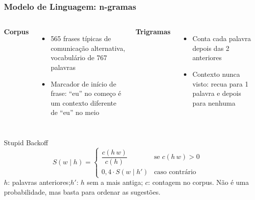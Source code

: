 \documentclass{UnBeamer}
\begin{document}
\subsubsection{Modelo de Linguagem: n-gramas}
\begin{frame}
    \small
    \begin{columns}[T]
            \textbf{Corpus}
            \begin{itemize}
                \item 565 frases típicas de comunicação alternativa,
                      vocabulário de 767 palavras
                \item Marcador de início de frase: ``eu'' no começo é
                      um contexto diferente de ``eu'' no meio
            \end{itemize}
            \textbf{Trigramas}
            \begin{itemize}
                \item Conta cada palavra depois das 2 anteriores
                \item Contexto nunca visto: recua para 1 palavra e
                      depois para nenhuma
            \end{itemize}
    \end{columns}
    \begin{block}{Stupid Backoff~\cite{brants}}
        \[
            S(w \mid h) =
            \begin{cases}
                \dfrac{c(h\,w)}{c(h)} & \text{se } c(h\,w) > 0 \\[1.5ex]
                0{,}4 \cdot S(w \mid h') & \text{caso contrário}
            \end{cases}
        \]
        $h$: palavras anteriores;\quad $h'$: $h$ sem a mais antiga;\quad
        $c$: contagem no corpus.
        Não é uma probabilidade, mas basta para ordenar as sugestões.
    \end{block}
\end{frame}
\end{document}
